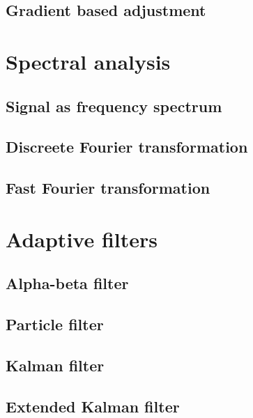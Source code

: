 \subsection{Gradient based adjustment}


\section{Spectral analysis}

\subsection{Signal as frequency spectrum}

\subsection{Discreete Fourier transformation}


\subsection{Fast Fourier transformation}


\section{Adaptive filters}

\subsection{Alpha-beta filter}

\subsection{Particle filter}

\subsection{Kalman filter}

\subsection{Extended Kalman filter}
